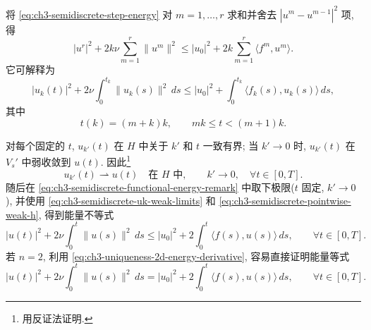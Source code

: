 \begin{Remark}
\label{rem:ch3-semidiscrete-energy-inequality}
将 \eqref{eq:ch3-semidiscrete-step-energy} 对 $m=1,\ldots,r$ 求和并舍去 $|u^m-u^{m-1}|^2$ 项, 得
\begin{equation}
|u^r|^2+2k\nu\sum_{m=1}^r\lVert u^m\rVert^2
\leq|u_0|^2+2k\sum_{m=1}^r\langle f^m,u^m\rangle.
\label{eq:ch3-semidiscrete-discrete-energy-remark}
\end{equation}
它可解释为
\begin{equation}
|u_k(t)|^2+2\nu\int_0^{t_k}\lVert u_k(s)\rVert^2\,ds
\leq|u_0|^2+\int_0^{t_k}\langle f_k(s),u_k(s)\rangle\,ds,
\label{eq:ch3-semidiscrete-functional-energy-remark}
\end{equation}
其中
\begin{equation}
t(k)=(m+k)k,
\qquad mk\leq t<(m+1)k.
\label{eq:ch3-semidiscrete-time-ceiling-source}
\end{equation}
\end{Remark}

\hypertarget{chapter-03-page-239}{}
对每个固定的 $t$, $u_{k'}(t)$ 在 $H$ 中关于 $k'$ 和 $t$ 一致有界; 当 $k'\to0$ 时, $u_{k'}(t)$ 在 $V_s'$ 中弱收敛到 $u(t)$. 因此\footnote{用反证法证明.}
\begin{equation}
u_{k'}(t)\rightharpoonup u(t)
\quad\text{在 }H\text{ 中},
\qquad k'\to0,\quad\forall t\in[0,T].
\label{eq:ch3-semidiscrete-pointwise-weak-h}
\end{equation}
随后在 \eqref{eq:ch3-semidiscrete-functional-energy-remark} 中取下极限($t$ 固定, $k'\to0$), 并使用 \eqref{eq:ch3-semidiscrete-uk-weak-limits} 和 \eqref{eq:ch3-semidiscrete-pointwise-weak-h}, 得到能量不等式
\begin{equation}
|u(t)|^2+2\nu\int_0^t\lVert u(s)\rVert^2\,ds
\leq|u_0|^2+2\int_0^t\langle f(s),u(s)\rangle\,ds,
\qquad\forall t\in[0,T].
\label{eq:ch3-semidiscrete-limit-energy-inequality}
\end{equation}
若 $n=2$, 利用 \eqref{eq:ch3-uniqueness-2d-energy-derivative}, 容易直接证明能量等式
\begin{equation}
|u(t)|^2+2\nu\int_0^t\lVert u(s)\rVert^2\,ds
=|u_0|^2+2\int_0^t\langle f(s),u(s)\rangle\,ds,
\qquad\forall t\in[0,T].
\label{eq:ch3-semidiscrete-limit-energy-equality-2d}
\end{equation}
